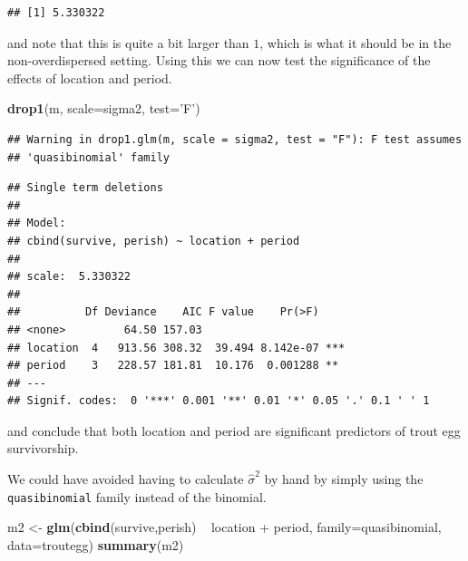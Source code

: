 \documentclass[]{book}
\newenvironment{Shaded}{\begin{snugshade}}{\end{snugshade}}
\newcommand{\KeywordTok}[1]{\textcolor[rgb]{0.13,0.29,0.53}{\textbf{{#1}}}}
\newcommand{\DataTypeTok}[1]{\textcolor[rgb]{0.13,0.29,0.53}{{#1}}}
\newcommand{\StringTok}[1]{\textcolor[rgb]{0.31,0.60,0.02}{{#1}}}
\newcommand{\NormalTok}[1]{{#1}}
\theoremstyle{definition}
\theoremstyle{definition}
\theoremstyle{remark}
\begin{document}
\begin{verbatim}
## [1] 5.330322
\end{verbatim}

and note that this is quite a bit larger than \(1\), which is what it
should be in the non-overdispersed setting. Using this we can now test
the significance of the effects of location and period.

\begin{Shaded}
\begin{Highlighting}[]
\KeywordTok{drop1}\NormalTok{(m, }\DataTypeTok{scale=}\NormalTok{sigma2, }\DataTypeTok{test=}\StringTok{'F'}\NormalTok{)}
\end{Highlighting}
\end{Shaded}

\begin{verbatim}
## Warning in drop1.glm(m, scale = sigma2, test = "F"): F test assumes
## 'quasibinomial' family
\end{verbatim}

\begin{verbatim}
## Single term deletions
## 
## Model:
## cbind(survive, perish) ~ location + period
## 
## scale:  5.330322 
## 
##          Df Deviance    AIC F value    Pr(>F)    
## <none>         64.50 157.03                      
## location  4   913.56 308.32  39.494 8.142e-07 ***
## period    3   228.57 181.81  10.176  0.001288 ** 
## ---
## Signif. codes:  0 '***' 0.001 '**' 0.01 '*' 0.05 '.' 0.1 ' ' 1
\end{verbatim}

and conclude that both location and period are significant predictors of
trout egg survivorship.

We could have avoided having to calculate \(\hat{\sigma}^{2}\) by hand
by simply using the \texttt{quasibinomial} family instead of the
binomial.

\begin{Shaded}
\begin{Highlighting}[]
\NormalTok{m2 <-}\StringTok{ }\KeywordTok{glm}\NormalTok{(}\KeywordTok{cbind}\NormalTok{(survive,perish) ~}\StringTok{ }\NormalTok{location +}\StringTok{ }\NormalTok{period, }
          \DataTypeTok{family=}\NormalTok{quasibinomial, }\DataTypeTok{data=}\NormalTok{troutegg) }
\KeywordTok{summary}\NormalTok{(m2)}
\end{Highlighting}
\end{Shaded}
\end{document}
